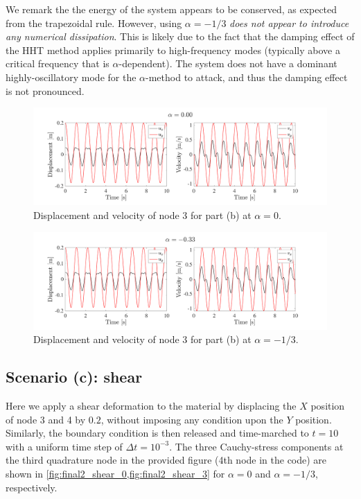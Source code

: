 We remark the the energy of the system appears to be conserved, as expected from the trapezoidal rule. 
However, using $\alpha = -1/3$ \emph{does not appear to introduce any numerical dissipation}. 
This is likely due to the fact that the damping effect of the HHT method applies primarily to high-frequency modes (typically above a critical frequency that is $\alpha$-dependent). 
The system does not have a dominant highly-oscillatory mode for the $\alpha$-method to attack, and thus the damping effect is not pronounced.

\begin{figure}[!ht]
    \centering
    \includegraphics[width=\textwidth]{final/part2/final2_stretch_0.pdf}
    \caption{Displacement and velocity of node 3 for part (b) at $\alpha = 0$.}
    \label{fig:final2_stretch_0}
\end{figure}

\begin{figure}[!ht]
    \centering
    \includegraphics[width=\textwidth]{final/part2/final2_stretch_333.pdf}
    \caption{Displacement and velocity of node 3 for part (b) at $\alpha = -1/3$.}
    \label{fig:final2_stretch_3}
\end{figure}

\subsection{Scenario (c): shear}
Here we apply a shear deformation to the material by displacing the $X$ position of node 3 and 4 by $0.2$, without imposing any condition upon the $Y$ position. 
Similarly, the boundary condition is then released and time-marched to $t = 10$ with a uniform time step of $\Delta t = 10^{-3}$.
The three Cauchy-stress components at the third quadrature node in the provided figure (4th node in the code) are shown in \cref{fig:final2_shear_0,fig:final2_shear_3} for $\alpha = 0$ and $\alpha = -1/3$, respectively.

